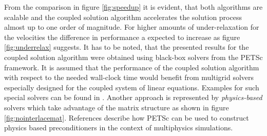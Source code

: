 From the comparison in figure \ref{fig:speedup} it is evident, that both algorithms are scalable and the coupled solution algorithm accelerates the solution process almost up to one order of magnitude. For higher amounts of under-relaxation for the velocities the difference in performance a expected to increase as figure \ref{fig:underrelax} suggests. It has to be noted, that the presented results for the coupled solution algorithm were obtained using black-box solvers from the PETSc framework. It is assumed that the performance of the coupled solution algorithm with respect to the needed wall-clock time would benefit from multigrid solvers especially designed for the coupled system of linear equations. Examples for such special solvers can be found in \cite{darwish09,klaij13,mangani14}. Another approach is represented by \emph{physics-based} solvers which take advantage of the matrix structure as shown in figure \ref{fig:nointerlacemat}. References \cite{brown12,mcinnes14} describe how PETSc can be used to construct physics based preconditioners in the context of multiphysics simulations.


